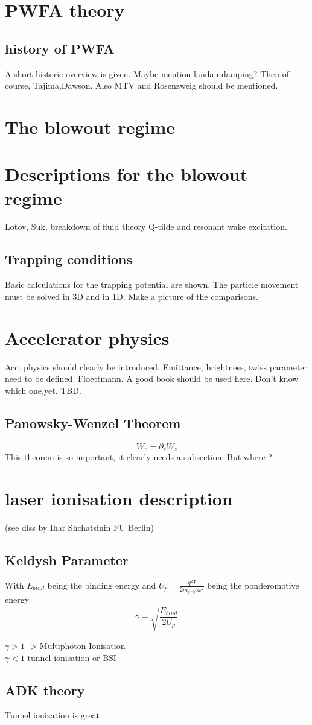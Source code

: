\section{PWFA theory}
\subsection{history of PWFA}
A short historic overview is given. 
Maybe mention landau damping? Then of course, Tajima,Dawson. Also MTV and Rosenzweig should be mentioned.

\section{The blowout regime}

\section{Descriptions for the blowout regime}
Lotov, Suk, breakdown of fluid theory
Q-tilde and resonant wake excitation.
\subsection{Trapping conditions}
Basic calculations for the trapping potential are shown.
The particle movement must be solved in 3D and in 1D. Make a picture of the comparisons.


\section{Accelerator physics}
Acc. physics should clearly be introduced. Emittance, brightness, twiss parameter need to be defined. Floettmann. A good book should be used here. Don't know which one,yet. TBD.
\subsection{Panowsky-Wenzel Theorem}
 \begin{equation}
W_r =\partial_r W_z
\end{equation} 
This theorem is so important, it clearly needs a subsection. But where ?
\section{laser ionisation description}
(see diss by Ihar Shchatsinin FU Berlin)
\subsection{Keldysh Parameter}

With $E_{bind}$ being the binding energy and $U_p=\frac{q^2 I}{2 m_e \epsilon_0 c \omega^2}$ being the ponderomotive energy 
\begin{equation}
\gamma=\sqrt{\frac{E_{bind}}{2U_p}}
\end{equation}

$\gamma >1 $ -> Multiphoton Ionisation\\
$\gamma < 1$ tunnel ionisation or BSI

\subsection{ADK theory}
Tunnel ionization is great